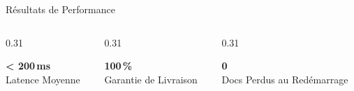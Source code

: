 \documentclass[aspectratio=169]{beamer}
\begin{document}
\begin{frame}{Résultats de Performance}
  \begin{columns}
    \begin{column}{0.31\textwidth}
      \begin{tcolorbox}[statcard, colframe=accent]
        \Large \textbf{\textcolor{accent}{< 200\,ms}}\\ \scriptsize Latence Moyenne
      \end{tcolorbox}
    \end{column}
    \begin{column}{0.31\textwidth}
      \begin{tcolorbox}[statcard, colframe=success]
        \Large \textbf{\textcolor{success}{100\,\%}}\\ \scriptsize Garantie de Livraison
      \end{tcolorbox}
    \end{column}
    \begin{column}{0.31\textwidth}
      \begin{tcolorbox}[statcard, colframe=accentsec]
        \Large \textbf{\textcolor{accentsec}{0}}\\ \scriptsize Docs Perdus au Redémarrage
      \end{tcolorbox}
    \end{column}
  \end{columns}


\end{frame}
\end{document}
